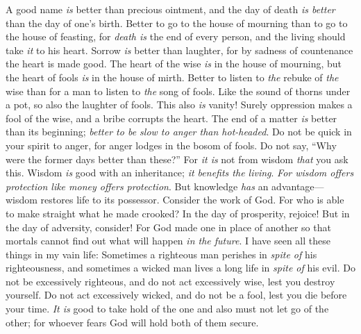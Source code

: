 \begin{biblechapter} %
 A good name \textit{is} better than precious ointment, 
and the day of death \textit{is better} than the day of one’s birth.
\verse Better to go to the house of mourning 
than to go to the house of feasting, 
for \textit{death is} the end of every person, 
and the living should take \textit{it} to his heart.
\verse Sorrow \textit{is} better than laughter, 
for by sadness of countenance the heart is made good.
\verse The heart of the wise \textit{is} in the house of mourning, 
but the heart of fools \textit{is} in the house of mirth.
\verse Better to listen to \textit{the} rebuke of \textit{the} wise 
than for a man to listen to \textit{the} song of fools.
\verse Like the sound of thorns under a pot, 
so also the laughter of fools. 
This also \textit{is} vanity!
 Surely oppression makes a fool of the wise, 
and a bribe corrupts the heart.
\verse The end of a matter \textit{is} better than its beginning; 
\textit{better to be slow to anger than hot-headed}.
\verse Do not be quick in your spirit to anger, 
for anger lodges in the bosom of fools.
\verse Do not say, “Why were the former days better than these?” 
For \textit{it is} not from wisdom \textit{that} you ask this.
\verse Wisdom \textit{is} good with an inheritance; 
\textit{it benefits the living}.
\verse \textit{For wisdom offers protection like money offers protection}. 
But knowledge \textit{has} an advantage—wisdom restores life to its possessor.
 Consider the work of God. 
For who is able to make straight what he made crooked?
\verse In the day of prosperity, rejoice! 
But in the day of adversity, consider! 
For God made one in place of another 
so that mortals cannot find out what will happen \textit{in the future}.
 I have seen all these things in my vain life: 
Sometimes a righteous man perishes in \textit{spite of} his righteousness, 
and sometimes a wicked man lives a long life in \textit{spite of} his evil.
\verse Do not be excessively righteous, 
and do not act excessively wise, lest you destroy yourself.
\verse Do not act excessively wicked, 
and do not be a fool, lest you die before your time.
\verse \textit{It is} good to take hold of the one and also must not let go of the other; 
for whoever fears God will hold both of them secure.

\end{biblechapter}

